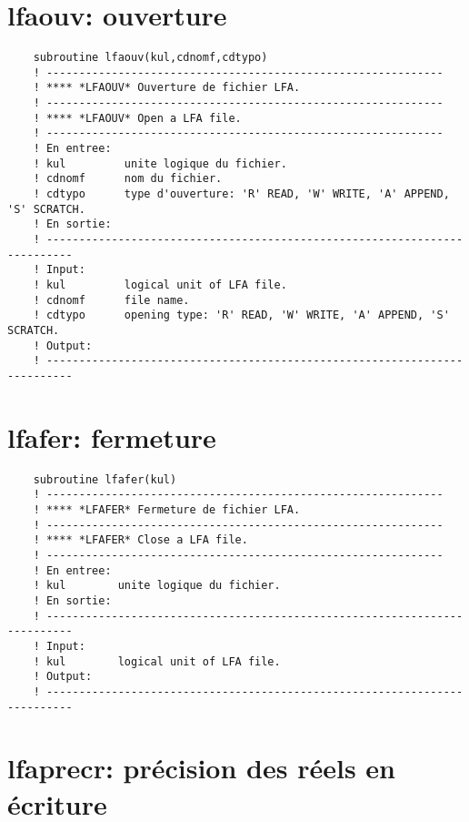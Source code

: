 \documentclass[10pt,french]{book}
\begin{document}
\section{lfaouv: ouverture}
 
 
 
\begin{verbatim}
	subroutine lfaouv(kul,cdnomf,cdtypo)
	! -------------------------------------------------------------                
	! **** *LFAOUV* Ouverture de fichier LFA.
	! -------------------------------------------------------------                
	! **** *LFAOUV* Open a LFA file.
	! -------------------------------------------------------------                
	! En entree:
	! kul         unite logique du fichier.
	! cdnomf      nom du fichier.
	! cdtypo      type d'ouverture: 'R' READ, 'W' WRITE, 'A' APPEND, 'S' SCRATCH.
	! En sortie:
	! --------------------------------------------------------------------------
	! Input:
	! kul         logical unit of LFA file.
	! cdnomf      file name.
	! cdtypo      opening type: 'R' READ, 'W' WRITE, 'A' APPEND, 'S' SCRATCH.
	! Output:
	! --------------------------------------------------------------------------
\end{verbatim}
\section{lfafer: fermeture}
 
 
 
\begin{verbatim}
	subroutine lfafer(kul)
	! -------------------------------------------------------------                
	! **** *LFAFER* Fermeture de fichier LFA.
	! -------------------------------------------------------------                
	! **** *LFAFER* Close a LFA file.
	! -------------------------------------------------------------                
	! En entree:
	! kul        unite logique du fichier.
	! En sortie:
	! --------------------------------------------------------------------------
	! Input:
	! kul        logical unit of LFA file.
	! Output:
	! --------------------------------------------------------------------------
\end{verbatim}
 
\section{lfaprecr: précision des réels en écriture}
 
\end{document}
